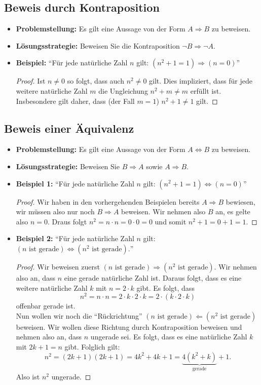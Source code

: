 \subsection*{Beweis durch Kontraposition}
\begin{itemize}
 \item[] \textbf{Problemstellung:} Es gilt eine Aussage von der Form $A\Rightarrow B$ zu beweisen.
\item[] \textbf{Lösungsstrategie:} Beweisen Sie die Kontraposition $\neg B\Rightarrow\neg A$.
\item[]\textbf{Beispiel:} ``Für jede natürliche Zahl $n$ gilt: $(n^2+1=1)\Rightarrow (n=0)$''
\begin{proof}
Ist $n\neq 0$ so folgt, dass auch $n^2\neq 0$ gilt. Dies impliziert, dass für jede weitere natürliche Zahl $m$ die Ungleichung $n^2+m\neq m$ erfüllt ist. Insbesondere gilt daher, dass (der Fall $m=1$) $n^2+1\neq 1$ gilt.
\end{proof}
\end{itemize}

\subsection*{Beweis einer Äquivalenz}
\begin{itemize}
 \item[] \textbf{Problemstellung:} Es gilt eine Aussage von der Form $A\Leftrightarrow B$ zu beweisen.
\item[] \textbf{Lösungsstrategie:} Beweisen Sie $B\Rightarrow A$ sowie $A\Rightarrow B$.
\item[]\textbf{Beispiel 1:} ``Für jede natürliche Zahl $n$ gilt: $(n^2+1=1)\Leftrightarrow (n=0)$''
\begin{proof}
Wir haben in den vorhergehenden Beispielen bereits $A\Rightarrow B$ bewiesen, wir müssen also nur noch $B\Rightarrow A$ beweisen. Wir nehmen also $B$ an, es gelte also $n=0$. Draus folgt $n^2=n\cdot n=0\cdot 0=0$ und somit $n^2+1=0+1=1$.
\end{proof}
\item[]\textbf{Beispiel 2:} ``Für jede natürliche Zahl $n$ gilt: $(n\text{ ist gerade})\Leftrightarrow (n^2\text{ ist gerade}).$''
\begin{proof}
Wir beweisen zuerst $(n\text{ ist gerade})\Rightarrow (n^2\text{ ist gerade})$. Wir nehmen also an, dass $n$ eine gerade natürliche Zahl ist. Daraus folgt, dass es eine weitere natürliche Zahl $k$ mit $n=2\cdot k$ gibt. Es folgt, dass
\[
n^2=n\cdot n=2\cdot k\cdot 2\cdot k=2\cdot (k\cdot 2\cdot k)
\]
offenbar gerade ist.\\
Nun wollen wir noch die ``Rückrichtung'' $(n\text{ ist gerade})\Leftarrow (n^2\text{ ist gerade})$ beweisen. Wir wollen diese Richtung durch Kontraposition beweisen und nehmen also an, dass $n$ ungerade sei. Es folgt, dass es eine natürliche Zahl $k$ mit $2k+1=n$ gibt. Folglich gilt:
\[
  n^2=(2k+1)(2k+1)=4k^2+4k+1=\underbrace{4(k^2+k)}_{\text{gerade}}+1.
\]
Also ist $n^2$ ungerade.
\end{proof}
\end{itemize}


